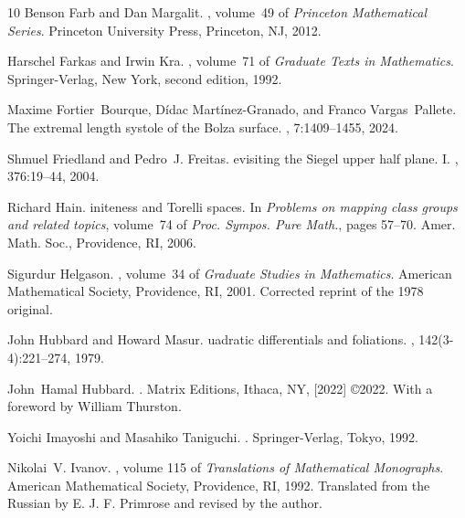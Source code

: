 \documentclass[dvipdfmx]{amsart}
\theoremstyle{remark}
\begin{document}
\begin{thebibliography}{10}
Benson Farb and Dan Margalit.
, volume~49 of {\em Princeton Mathematical Series}.
\newblock Princeton University Press, Princeton, NJ, 2012.

Harschel Farkas and Irwin Kra.
, volume~71 of {\em Graduate Texts in Mathematics}.
\newblock Springer-Verlag, New York, second edition, 1992.

Maxime Fortier~Bourque, D\'idac Mart\'inez-Granado, and Franco Vargas~Pallete.
\newblock The extremal length systole of the {B}olza surface.
, 7:1409--1455, 2024.

Shmuel Friedland and Pedro~J. Freitas.
evisiting the {S}iegel upper half plane. {I}.
, 376:19--44, 2004.

Richard Hain.
initeness and {T}orelli spaces.
\newblock In {\em Problems on mapping class groups and related topics}, volume~74 of {\em Proc. Sympos. Pure Math.}, pages 57--70. Amer. Math. Soc., Providence, RI, 2006.

Sigurdur Helgason.
, volume~34 of {\em Graduate Studies in Mathematics}.
\newblock American Mathematical Society, Providence, RI, 2001.
\newblock Corrected reprint of the 1978 original.

John Hubbard and Howard Masur.
uadratic differentials and foliations.
, 142(3-4):221--274, 1979.

John~Hamal Hubbard.
.
\newblock Matrix Editions, Ithaca, NY, [2022] \copyright 2022.
\newblock With a foreword by William Thurston.

Yoichi Imayoshi and Masahiko Taniguchi.
.
\newblock Springer-Verlag, Tokyo, 1992.

Nikolai~V. Ivanov.
, volume 115 of {\em Translations of Mathematical Monographs}.
\newblock American Mathematical Society, Providence, RI, 1992.
\newblock Translated from the Russian by E. J. F. Primrose and revised by the author.


\end{thebibliography}
\end{document}

